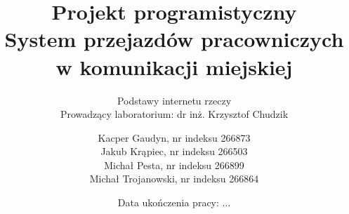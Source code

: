 \documentclass[10pt, a4paper, titlepage]{article}
\title{
  Projekt programistyczny \\
  System przejazdów pracowniczych w komunikacji miejskiej
}
\subtitle{
  Podstawy internetu rzeczy \\
  Prowadzący laboratorium: dr inż. Krzysztof Chudzik
}
\author{
  Kacper Gaudyn, nr indeksu 266873 \\
  Jakub Krąpiec, nr indeksu 266503 \\
  Michał Pesta, nr indeksu 266899 \\
  Michał Trojanowski, nr indeksu 266864
}
\date{Data ukończenia pracy: ...}
\begin{document}
  \begin{titlingpage}
    \maketitle
  \end{titlingpage}
  \tableofcontents

  \newpage
  
  
  
  
\end{document}
